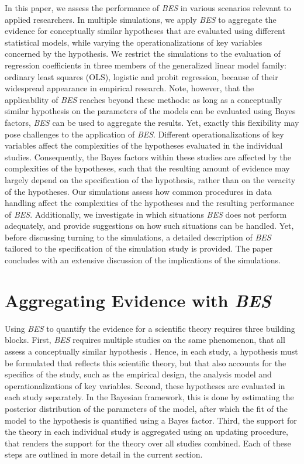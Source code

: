 \documentclass[review, 3p, authoryear]{elsarticle} %
\begin{document}
In this paper, we assess the performance of \emph{BES} in various scenarios relevant to applied researchers.
In multiple simulations, we apply \emph{BES} to aggregate the evidence for conceptually similar hypotheses that are evaluated using different statistical models, while varying the operationalizations of key variables concerned by the hypothesis.
We restrict the simulations to the evaluation of regression coefficients in three members of the generalized linear model family: ordinary least squares (OLS), logistic and probit regression, because of their widespread appearance in empirical research.
Note, however, that the applicability of \emph{BES} reaches beyond these methods: as long as a conceptually similar hypothesis on the parameters of the models can be evaluated using Bayes factors, \emph{BES} can be used to aggregate the results.
Yet, exactly this flexibility may pose challenges to the application of \emph{BES}.
Different operationalizations of key variables affect the complexities of the hypotheses evaluated in the individual studies.
Consequently, the Bayes factors within these studies are affected by the complexities of the hypotheses, such that the resulting amount of evidence may largely depend on the specification of the hypothesis, rather than on the veracity of the hypotheses.
Our simulations assess how common procedures in data handling affect the complexities of the hypotheses and the resulting performance of \emph{BES}.
Additionally, we investigate in which situations \emph{BES} does not perform adequately, and provide suggestions on how such situations can be handled.
Yet, before discussing turning to the simulations, a detailed description of \emph{BES} tailored to the specification of the simulation study is provided.
The paper concludes with an extensive discussion of the implications of the simulations.

\hypertarget{aggregating-evidence-with-bes}{%
\section{\texorpdfstring{Aggregating Evidence with \emph{BES}}{Aggregating Evidence with BES}}\label{aggregating-evidence-with-bes}}

Using \emph{BES} to quantify the evidence for a scientific theory requires three building blocks.
First, \emph{BES} requires multiple studies on the same phenomenon, that all assess a conceptually similar hypothesis \citep{kuiper_combining_2013}.
Hence, in each study, a hypothesis must be formulated that reflects this scientific theory, but that also accounts for the specifics of the study, such as the empirical design, the analysis model and operationalizations of key variables.
Second, these hypotheses are evaluated in each study separately.
In the Bayesian framework, this is done by estimating the posterior distribution of the parameters of the model, after which the fit of the model to the hypothesis is quantified using a Bayes factor.
Third, the support for the theory in each individual study is aggregated using an updating procedure, that renders the support for the theory over all studies combined.
Each of these steps are outlined in more detail in the current section.
\end{document}
